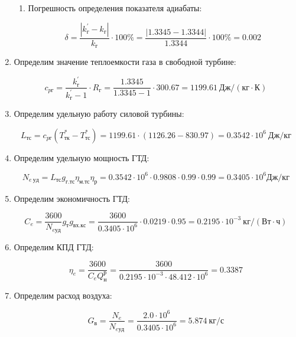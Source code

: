 \documentclass[a4paper,10pt]{article}
\begin{document}
\begin{enumerate}
\begin{enumerate}
		\item Погрешность определения показателя адиабаты:
		
		\[
		\delta = \frac{ \left| k_{г}^\prime - k_{г} \right| }{ k_{г} } \cdot 100 \% =
				\frac{ \left|  1.3345 - 1.3344 \right| }{ 1.3344 } \cdot 100 \% =
				0.002
		\]
	
	\end{enumerate}
	
	\item Определим значение теплоемкости газа в свободной турбине:
	
	\[
	c_{pг} = \frac{ k_г^\prime }{ k_г^\prime - 1 } \cdot R_г = 
			\frac{ 1.3345 }{ 1.3345 - 1 } \cdot 300.67
			= 1199.61\ Дж/(кг \cdot К)
	\]
	
	\item Определим удельную работу силовой турбины:
	
	\[
	L_{тс} = c_{pг} ( T_{тк}^* -  T_{тс}^*) = 
		1199.61 \cdot ( 1126.26 -  830.97 ) = 
		0.3542 \cdot 10^6\ Дж/кг
	\]
	
	\item Определим удельную мощность ГТД:
	
	
	
	\[
	N_{e\ уд} = L_{тс} g_{г.тс} \eta_{м.тс} \eta_р = 
			0.3542 \cdot 10^6 \cdot 0.9808 \cdot 0.99 \cdot 0.99 =
	0.3405 \cdot 10^6 Дж/кг
	\]
	
	\item Определим экономичность ГТД:
	
	
	
	\[
	C_e = \frac{ 3600 }{ N_{e уд} } g_т g_{вх.кс} = 
			\frac{ 3600 }{ 0.3405 \cdot 10^6} \cdot 0.0219 \cdot 0.95 = 
	0.2195 \cdot 10^{-3}\ кг/\left( Вт \cdot ч \right)
	\]
	
	\item Определим КПД ГТД:
	
	\[
	\eta_e = \frac{ 3600 }{ C_e Q_н^р } = 
			\frac{ 3600 }{ 0.2195 \cdot 10^{-3} \cdot 48.412 \cdot 10^6} 
	= 0.3387
	\]
	
	\item Определим расход воздуха:
	
	\[
	G_в = \frac{N_e}{N_{e уд} } = 
	\frac{ 2.0 \cdot 10^6 }{ 0.3405 \cdot 10^6 } = 
	5.874\ кг/с
	\]

\end{enumerate}
\end{document}
